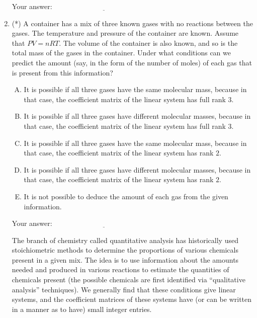 \documentclass[10pt]{amsart}
\begin{document}
\begin{enumerate}
  \vspace{0.1in}
  Your answer: $\underline{\qquad\qquad\qquad\qquad\qquad\qquad\qquad}$
  \vspace{0.1in}

\item (*) A container has a mix of three known gases with no reactions
  between the gases. The temperature and pressure of the container are
  known. Assume that $PV = nRT$. The volume of the container is also
  known, and so is the total mass of the gases in the container. Under
  what conditions can we predict the amount (say, in the form of the
  number of moles) of each gas that is present from this information?

  \begin{enumerate}[(A)]
  \item It is possible if all three gases have the same molecular mass,
    because in that case, the coefficient matrix of the linear system
    has full rank $3$.
  \item It is possible if all three gases have different molecular
    masses, because in that case, the coefficient matrix of the linear
    system has full rank $3$.
  \item It is possible if all three gases have the same molecular mass,
    because in that case, the coefficient matrix of the linear system
    has rank $2$.
  \item It is possible if all three gases have different molecular
    masses, because in that case, the coefficient matrix of the linear
    system has rank $2$.
  \item It is not possible to deduce the amount of each gas from the
    given information.
  \end{enumerate}

  \vspace{0.1in}
  Your answer: $\underline{\qquad\qquad\qquad\qquad\qquad\qquad\qquad}$
  \vspace{0.1in}

The branch of chemistry called quantitative analysis has historically
used stoichiometric methods to determine the proportions of various
chemicals present in a given mix. The idea is to use information about
the amounts needed and produced in various reactions to estimate the
quantities of chemicals present (the possible chemicals are first
identified via ``qualitative analysis'' techniques). We generally find
that these conditions give linear systems, and the coefficient
matrices of these systems have (or can be written in a manner as to
have) small integer entries. 


\end{enumerate}
\end{document}
